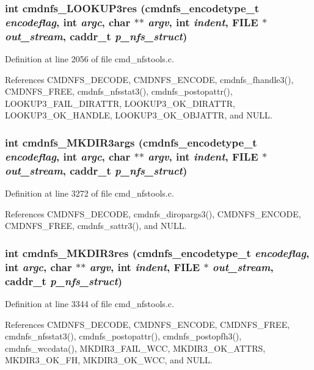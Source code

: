 \subsubsection{\setlength{\rightskip}{0pt plus 5cm}int cmdnfs\_\-LOOKUP3res ({\bf cmdnfs\_\-encodetype\_\-t} {\em encodeflag}, int {\em argc}, char $\ast$$\ast$ {\em argv}, int {\em indent}, FILE $\ast$ {\em out\_\-stream}, caddr\_\-t {\em p\_\-nfs\_\-struct})}\label{cmd__nfstools_8h_a41}




Definition at line 2056 of file cmd\_\-nfstools.c.

References CMDNFS\_\-DECODE, CMDNFS\_\-ENCODE, cmdnfs\_\-fhandle3(), CMDNFS\_\-FREE, cmdnfs\_\-nfsstat3(), cmdnfs\_\-postopattr(), LOOKUP3\_\-FAIL\_\-DIRATTR, LOOKUP3\_\-OK\_\-DIRATTR, LOOKUP3\_\-OK\_\-HANDLE, LOOKUP3\_\-OK\_\-OBJATTR, and NULL.
\subsubsection{\setlength{\rightskip}{0pt plus 5cm}int cmdnfs\_\-MKDIR3args ({\bf cmdnfs\_\-encodetype\_\-t} {\em encodeflag}, int {\em argc}, char $\ast$$\ast$ {\em argv}, int {\em indent}, FILE $\ast$ {\em out\_\-stream}, caddr\_\-t {\em p\_\-nfs\_\-struct})}\label{cmd__nfstools_8h_a52}




Definition at line 3272 of file cmd\_\-nfstools.c.

References CMDNFS\_\-DECODE, cmdnfs\_\-diropargs3(), CMDNFS\_\-ENCODE, CMDNFS\_\-FREE, cmdnfs\_\-sattr3(), and NULL.
\subsubsection{\setlength{\rightskip}{0pt plus 5cm}int cmdnfs\_\-MKDIR3res ({\bf cmdnfs\_\-encodetype\_\-t} {\em encodeflag}, int {\em argc}, char $\ast$$\ast$ {\em argv}, int {\em indent}, FILE $\ast$ {\em out\_\-stream}, caddr\_\-t {\em p\_\-nfs\_\-struct})}\label{cmd__nfstools_8h_a53}




Definition at line 3344 of file cmd\_\-nfstools.c.

References CMDNFS\_\-DECODE, CMDNFS\_\-ENCODE, CMDNFS\_\-FREE, cmdnfs\_\-nfsstat3(), cmdnfs\_\-postopattr(), cmdnfs\_\-postopfh3(), cmdnfs\_\-wccdata(), MKDIR3\_\-FAIL\_\-WCC, MKDIR3\_\-OK\_\-ATTRS, MKDIR3\_\-OK\_\-FH, MKDIR3\_\-OK\_\-WCC, and NULL.
